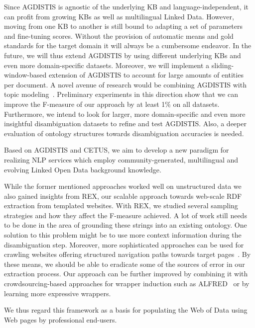 Since AGDISTIS is agnostic of the underlying \ac{KB} and language-independent, it can profit from growing \ac{KB}s as well as multilingual Linked Data.
However, moving from one \ac{KB} to another is still bound to adapting a set of parameters and fine-tuning scores. 
Without the provision of automatic means and gold standards for the target domain it will always be a cumbersome endeavor. 
In the future, we will thus extend AGDISTIS by using different underlying \ac{KB}s and even more domain-specific datasets.
Moreover, we will implement a sliding-window-based extension of AGDISTIS to account for large amounts of entities per document.
A novel avenue of research would be combining AGDISTIS with topic modeling~\cite{Blei:2003:LDA:944919.944937}. 
Preliminary experiments in this direction show that we can improve the F-measure of our approach by at least 1\% on all datasets.
Furthermore, we intend to look for larger, more domain-specific and even more insightful disambiguation datasets to refine and test AGDISTIS.
Also, a deeper evaluation of ontology structures towards disambiguation accuracies is needed.

Based on AGDISTIS and CETUS, we aim to develop a new paradigm for realizing \ac{NLP} services which employ community-generated, multilingual and evolving Linked Open Data background knowledge.



While the former mentioned approaches worked well on unstructured data we also gained insights from REX, our scalable approach towards web-scale RDF extraction from templated websites. 
With REX, we studied several sampling strategies and how they affect the F-measure achieved.
A lot of work still needs to be done in the area of grounding these strings into an existing ontology.
One solution to this problem might be to use more context information during the disambiguation step.
Moreover, more sophisticated approaches can be used for crawling websites offering structured navigation paths towards target pages~\cite{DBLP:conf/webist/BlancoCM05}. 
By these means, we should be able to eradicate some of the sources of error in our extraction process. 
Our approach can be further improved by combining it with crowdsourcing-based approaches for wrapper induction such as ALFRED~\cite{Crescenzi2013} or by learning more expressive wrappers.

We thus regard this framework as a basis for populating the Web of Data using Web pages by professional end-users.


